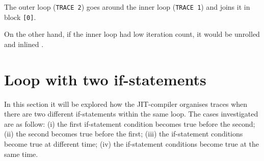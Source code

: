 \begin{comment}
TRACE 1 contains the instruction of the inner loop. At line 0001 SLOAD (store a value) is used to init the register used by the loop. Lines 0002-0008 take the reference and load \textit{x}. Lines 0009-0012 contain the loop unrolled and lines 0014-0017 the actual loop. The value of x is incremented by 1 (ADD) and the result is stored (HSTORE), then the loop is incremented (ADD) and  it is checked the loop termination (LE). Then, in line 0010 it is executed $x=x+1$ and the result is stored (line 0011). Finally the loop is incremented (line 0012) and it is checked the loop termination (line 0013). The last line 0014 converts the number in integer.

In TRACE 2 it is shown the instruction related to the outer loop. In this case is computed the operation $x=x*3$ (line 0011). The other lines show instruction previously described.\\

\end{comment}
\noindent
The outer loop (\texttt{TRACE 2}) goes around the inner loop (\texttt{TRACE 1}) and joins it in block \texttt{[0]}.

On the other hand, if the inner loop had low iteration count, it would be unrolled and inlined \cite{lj-mail-understand-compiler}.

\newpage

\section{Loop with two if-statements}
\label{section:2-if-statements}

In this section it will be explored how the JIT-compiler organises traces when there are two different if-statements within the same loop. The cases investigated are as follow: (i) the first if-statement condition becomes true before the second; (ii) the second becomes true before the first; (iii) the if-statement conditions become true at different time; (iv) the if-statement conditions become true at the same time.

